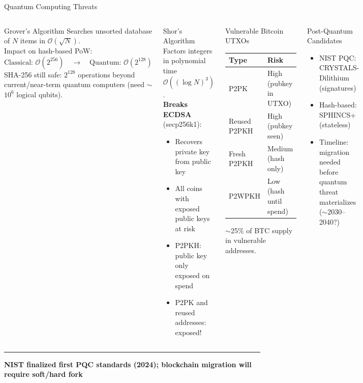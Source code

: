 \documentclass[8pt,aspectratio=169]{beamer}
\newcommand{\bottomnote}[1]{\vfill\vspace{-2mm}\textcolor{mllavender2}{\rule{\textwidth}{0.4pt}}\vspace{1mm}\footnotesize\textbf{#1}}
\begin{document}
\begin{frame}{Quantum Computing Threats}
\begin{columns}
\begin{block}{Grover's Algorithm}
Searches unsorted database of $N$ items in $\mathcal{O}(\sqrt{N})$.\\[4pt]
Impact on hash-based PoW:
\[\text{Classical: } \mathcal{O}(2^{256})\quad\to\quad\text{Quantum: } \mathcal{O}(2^{128})\]
SHA-256 still safe: $2^{128}$ operations beyond current/near-term quantum computers (need $\sim$$10^6$ logical qubits).
\end{block}
\vspace{2mm}
\begin{block}{Shor's Algorithm}
Factors integers in polynomial time $\mathcal{O}((\log N)^3)$.\\[4pt]
\textbf{Breaks ECDSA} (secp256k1):
\begin{itemize}\small
  \item Recovers private key from public key
  \item All coins with exposed public keys at risk
  \item P2PKH: public key only exposed on spend
  \item P2PK and reused addresses: exposed!
\end{itemize}
\end{block}
\begin{block}{Vulnerable Bitcoin UTXOs}
\begin{tabular}{ll}
\toprule
\textbf{Type} & \textbf{Risk}\\
\midrule
P2PK & High (pubkey in UTXO)\\
Reused P2PKH & High (pubkey seen)\\
Fresh P2PKH & Medium (hash only)\\
P2WPKH & Low (hash until spend)\\
\bottomrule
\end{tabular}
$\sim$25\% of BTC supply in vulnerable addresses.
\end{block}
\vspace{2mm}
\begin{block}{Post-Quantum Candidates}
\begin{itemize}\small
  \item NIST PQC: CRYSTALS-Dilithium (signatures)
  \item Hash-based: SPHINCS+ (stateless)
  \item Timeline: migration needed before quantum threat materializes ($\sim$2030--2040?)
\end{itemize}
\end{block}
\end{columns}
\bottomnote{NIST finalized first PQC standards (2024); blockchain migration will require soft/hard fork}
\end{frame}
\end{document}
